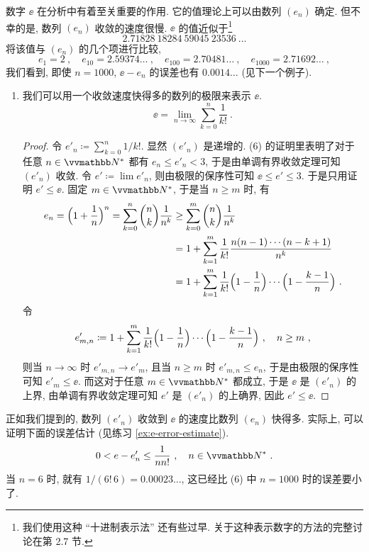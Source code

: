 \begin{example}
    数字 \(\ee\) 在分析中有着至关重要的作用. 它的值理论上可以由数列 \((e_n)\) 确定. 但不幸的是, 数列 \((e_n)\) 收敛的速度很慢. \(\ee\) 的值近似于\footnote{我们使用这种 ``十进制表示法'' 还有些过早. 关于这种表示数字的方法的完整讨论在第 2.7 节.}
    \[
        2.71828\ 18284\ 59045\ 23536\ \ldots
    \]
    将该值与 \((e_n)\) 的几个项进行比较,
    \[
        e_1 = 2\ ,\quad e_{10} = 2.59374 \ldots\ ,\quad e_{100} = 2.70481 \ldots\ ,\quad e_{1000} = 2.71692 \ldots\ ,
    \]
    我们看到, 即使 \(n = 1000\), \(\ee - e_n\) 的误差也有 \(0.0014 \ldots\) (见下一个例子).

    \begin{enumerate}[start=7]
        \item 我们可以用一个收敛速度快得多的数列的极限来表示 \(\ee\).
        \[
            \ee = \lim_{n \to \infty} \sum_{k = 0}^n \frac{1}{k!}\ .
        \]
        \begin{proof}
            令 \(e'_n \coloneqq \sum_{k = 0}^n 1 / k!\). 显然 \((e'_n)\) 是递增的. (6) 的证明里表明了对于任意 \(n \in \N^\ast\) 都有 \(e_n \leq e'_n < 3\), 于是由单调有界收敛定理可知 \((e'_n)\) 收敛. 令 \(e' \coloneqq \lim e'_n\), 则由极限的保序性可知 \(\ee \leq e' \leq 3\). 于是只用证明 \(e' \leq \ee\). 固定 \(m \in \N^\ast\), 于是当 \(n \geq m\) 时, 有
            \begin{align*}
                e_n = \Bigl(1 + \frac{1}{n}\Bigr)^n = \sum_{k = 0}^n \binom{n}{k} \frac{1}{n^k} &\geq \sum_{k = 0}^m \binom{n}{k} \frac{1}{n^k}\\
                &= 1 + \sum_{k = 1}^m \frac{1}{k!} \frac{n (n - 1) \cdots (n - k + 1)}{n^k}\\
                &= 1 + \sum_{k = 1}^m \frac{1}{k!} \Bigl(1 - \frac{1}{n}\Bigr) \cdots \Bigl(1 - \frac{k - 1}{n}\Bigr)\ .
            \end{align*}
            令
            \[
                e'_{m, n} \coloneqq 1 + \sum_{k = 1}^m \frac{1}{k!} \Bigl(1 - \frac{1}{n}\Bigr) \cdots \Bigl(1 - \frac{k - 1}{n}\Bigr)\ ,\quad n \geq m\ ,
            \]
            则当 \(n \to \infty\) 时 \(e'_{m, n} \to e'_m\), 且当 \(n \geq m\) 时 \(e'_{m, n} \leq e_n\), 于是由极限的保序性可知 \(e'_m \leq \ee\). 而这对于任意 \(m \in \N^\ast\) 都成立, 于是 \(\ee\) 是 \((e'_n)\) 的上界, 由单调有界收敛定理可知 \(e'\) 是 \((e'_n)\) 的上确界, 因此 \(e' \leq \ee\).
        \end{proof}
    \end{enumerate}

    正如我们提到的, 数列 \((e'_n)\) 收敛到 \(\ee\) 的速度比数列 \((e_n)\) 快得多. 实际上, 可以证明下面的误差估计 (见练习 \ref{ex:e-error-estimate}).
    \[
        0 < \ee - e'_n \leq \frac{1}{n n!}\ ,\quad n \in \N^\ast\ .
    \]
    当 \(n = 6\) 时, 就有 \(1 / (6!\, 6) = 0.00023 \ldots\), 这已经比 (6) 中 \(n = 1000\) 时的误差要小了.
\end{example}

